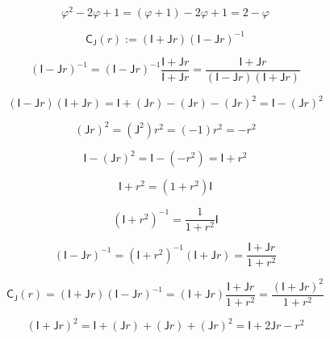 \documentclass[12pt]{article}
\begin{document}
\begin{equation}
\varphi^2-2\varphi+1=(\varphi+1)-2\varphi+1=2-\varphi
\end{equation}

\begin{equation}
\mathsf{C}_{\mathsf{J}}(r):=(\mathsf{I}+\mathsf{J}r)(\mathsf{I}-\mathsf{J}r)^{-1}
\end{equation}

\begin{equation}
(\mathsf{I}-\mathsf{J}r)^{-1}=(\mathsf{I}-\mathsf{J}r)^{-1}\frac{\mathsf{I}+\mathsf{J}r}{\mathsf{I}+\mathsf{J}r}
=\frac{\mathsf{I}+\mathsf{J}r}{(\mathsf{I}-\mathsf{J}r)(\mathsf{I}+\mathsf{J}r)}
\end{equation}

\begin{equation}
(\mathsf{I}-\mathsf{J}r)(\mathsf{I}+\mathsf{J}r)
=\mathsf{I}+(\mathsf{J}r)-(\mathsf{J}r)-(\mathsf{J}r)^2
=\mathsf{I}-(\mathsf{J}r)^2
\end{equation}

\begin{equation}
(\mathsf{J}r)^2=(\mathsf{J}^2)r^2=(-1)r^2=-r^2
\end{equation}

\begin{equation}
\mathsf{I}-(\mathsf{J}r)^2=\mathsf{I}-(-r^2)=\mathsf{I}+r^2
\end{equation}

\begin{equation}
\mathsf{I}+r^2=(1+r^2)\mathsf{I}
\end{equation}

\begin{equation}
(\mathsf{I}+r^2)^{-1}=\frac{1}{1+r^2}\mathsf{I}
\end{equation}

\begin{equation}
(\mathsf{I}-\mathsf{J}r)^{-1}=(\mathsf{I}+r^2)^{-1}(\mathsf{I}+\mathsf{J}r)=\frac{\mathsf{I}+\mathsf{J}r}{1+r^2}
\end{equation}

\begin{equation}
\mathsf{C}_{\mathsf{J}}(r)
=(\mathsf{I}+\mathsf{J}r)(\mathsf{I}-\mathsf{J}r)^{-1}
=(\mathsf{I}+\mathsf{J}r)\frac{\mathsf{I}+\mathsf{J}r}{1+r^2}
=\frac{(\mathsf{I}+\mathsf{J}r)^2}{1+r^2}
\end{equation}

\begin{equation}
(\mathsf{I}+\mathsf{J}r)^2
=\mathsf{I}+(\mathsf{J}r)+(\mathsf{J}r)+(\mathsf{J}r)^2
=\mathsf{I}+2\mathsf{J}r-r^2
\end{equation}
\end{document}
